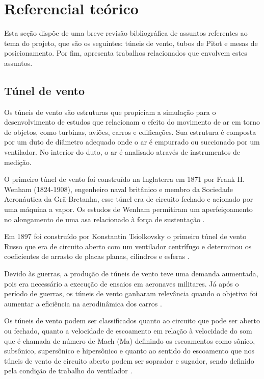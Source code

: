 \chapter{Referencial teórico}\label{ch:referencial}

Esta seção dispõe de uma breve revisão bibliográfica de assuntos referentes ao tema do projeto, que são 
os seguintes: túneis de vento, tubos de Pitot e mesas de posicionamento. Por fim, apresenta trabalhos 
relacionados que envolvem estes assuntos.

\section{Túnel de vento}\label{sec:tunel}

Os túneis de vento são estruturas que propiciam a simulação para o desenvolvimento de estudos que relacionam 
o efeito do movimento de ar em torno de objetos, como turbinas, aviões, carros e edificações. Sua estrutura 
é composta por um duto de diâmetro adequado onde o ar é empurrado ou succionado por um ventilador. No 
interior do duto, o ar é analisado através de instrumentos de medição.

O primeiro túnel de vento foi construído na Inglaterra em 1871 por Frank H. Wenham (1824-1908), engenheiro 
naval britânico e membro da Sociedade Aeronáutica da Grã-Bretanha, esse túnel era de circuito fechado e 
acionado por uma máquina a vapor. Os estudos de Wenham permitiram um aperfeiçoamento no alongamento de 
uma asa relacionado à força de sustentação \cite{carminatti2019desenvolvimento}.

Em 1897 foi construído por Konstantin Tsiolkovsky o primeiro túnel de vento Russo que era de circuito 
aberto com um ventilador centrífugo e determinou os coeficientes de arrasto de placas planas, cilindros 
e esferas \cite{joglekar2014design}. 

Devido às guerras, a produção de túneis de vento teve uma demanda aumentada, pois era necessário a execução 
de ensaios em aeronaves militares. Já após o período de guerras, os túneis de vento ganharam relevância 
quando o objetivo foi aumentar a eficiência na aerodinâmica dos carros \cite{de2014adalberto}. 

Os túneis de vento podem ser classificados quanto ao circuito que pode ser aberto ou fechado, quanto a velocidade 
de escoamento em relação à velocidade do som que é chamada de número de Mach (Ma) definindo os escoamentos como sônico, 
subsônico, supersônico e hipersônico e quanto ao sentido do escoamento que nos túneis de vento de circuito aberto podem 
ser soprador e sugador, sendo definido pela condição de trabalho do ventilador \cite{pritchard2005fox}.

